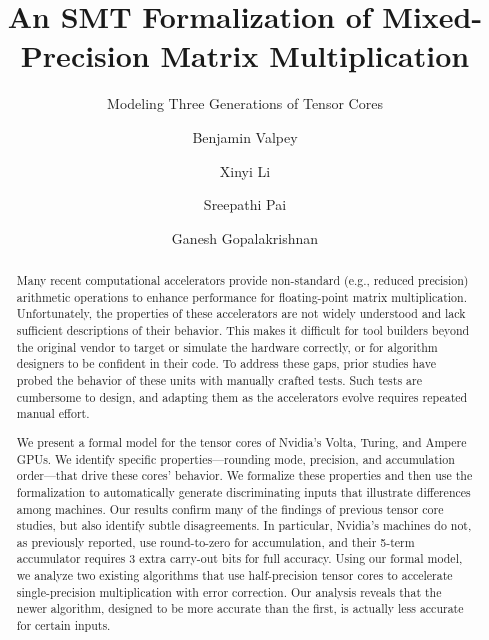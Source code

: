 \documentclass[runningheads]{llncs}
\begin{document}
\newtheorem{myprop}{Property}

\title{An SMT Formalization of Mixed-Precision Matrix Multiplication}
\subtitle{Modeling Three Generations of Tensor Cores}
\author{Benjamin Valpey \and
Xinyi Li \and
Sreepathi Pai \and Ganesh Gopalakrishnan }

\date{}
\maketitle

\begin{abstract}
Many recent computational accelerators provide non-standard (e.g.,
reduced precision) arithmetic operations to enhance
performance for floating-point matrix multiplication.  Unfortunately, the properties of these accelerators are
not widely understood and lack sufficient descriptions of their behavior. This makes it difficult for tool builders beyond the original vendor to target or simulate the hardware correctly, or for algorithm
designers to be confident in their code. To address these gaps, prior studies have probed the behavior of these units with manually crafted tests. Such tests are cumbersome to design, and adapting them as the accelerators evolve requires repeated manual effort.

We present a formal model for the tensor cores of
Nvidia's Volta, Turing, and Ampere GPUs.  We identify specific
properties---rounding mode, precision, and accumulation order---that
drive these cores' behavior.  We formalize these properties and then use
the formalization to automatically generate discriminating inputs that
illustrate differences among machines.  Our results confirm many of the
findings of previous tensor core studies, but also identify subtle
disagreements.  In particular, Nvidia's machines do not, as previously
reported, use round-to-zero for accumulation, and their 5-term
accumulator requires 3 extra carry-out bits for full accuracy.  Using
our formal model, we analyze two existing algorithms that use
half-precision tensor cores to accelerate single-precision
multiplication with error correction.  Our analysis reveals that the
newer algorithm, designed to be more accurate than the first, is
actually less accurate for certain inputs.
\end{abstract}
\end{document}
